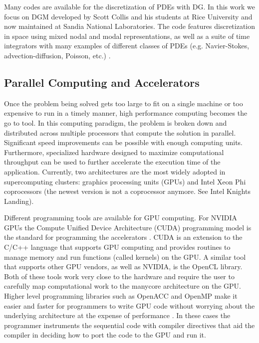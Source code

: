 \documentclass{ccr16}
\begin{document}
{{            Many codes are available for the discretization of PDEs with DG. In this work we focus on DGM developed by Scott Collis and his students at Rice University and now maintained at Sandia National Laboratories. The code features discretization in space using mixed nodal and modal representations, as well as a suite of time integrators with many examples of different classes of PDEs (e.g. Navier-Stokes, advection-diffusion, Poisson, etc.) \cite{PDBM:Collis}.
        }

        \subsection{Parallel Computing and Accelerators}
        {
            Once the problem being solved gets too large to fit on a single machine or too expensive to run in a timely manner, high performance computing becomes the go to tool. In this computing paradigm, the problem is broken down and distributed across multiple processors that compute the solution in parallel. Significant speed improvements can be possible with enough computing units. Furthermore, specialized hardware designed to maximize computational throughput can be used to further accelerate the execution time of the application. Currently, two architectures are the most widely adopted in supercomputing clusters: graphics processing units (GPUs) and Intel Xeon Phi coprocessors (the newest version is not a coprocessor anymore. See Intel Knights Landing).

            Different programming tools are available for GPU computing. For NVIDIA GPUs the Compute Unified Device Architecture (CUDA) programming model is the standard for programming the accelerators \cite{PDBM:Nickolls08}. CUDA is an extension to the C/C++ language that supports GPU computing and provides routines to manage memory and run functions (called kernels) on the GPU. A similar tool that supports other GPU vendors, as well as NVIDIA, is the OpenCL library. Both of these tools work very close to the hardware and require the user to carefully map computational work to the manycore architecture on the GPU. Higher level programming libraries such as OpenACC and OpenMP make it easier and faster for programmers to write GPU code without worrying about the underlying architecture at the expense of performance \cite{PDBM:Wienke12, PDBM:OpenMP15}. In these cases the programmer instruments the sequential code with compiler directives that aid the compiler in deciding how to port the code to the GPU and run it.

}}
\end{document}
